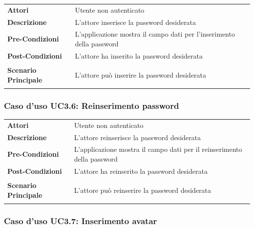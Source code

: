 \begin{longtable}{ l | p{11cm}}
	\hline
	\rowcolor{Gray}
	 \multicolumn{2}{c}{UC3.5 - Inserimento password} \\
	 \hline
	\textbf{Attori} & Utente non autenticato \\
	\textbf{Descrizione} & L'attore inserisce la password desiderata  \\
	\textbf{Pre-Condizioni} & L'applicazione mostra il campo dati per l'inserimento della password \\
	\textbf{Post-Condizioni} & L'attore ha inserito la password desiderata \\
	\textbf{Scenario Principale} & 
	\begin{enumerate*}[label=(\arabic*.),itemjoin={\newline}]
		\item L'attore può inserire la password desiderata
	\end{enumerate*}\\
\end{longtable}

\subsubsection{Caso d'uso UC3.6: Reinserimento password}
\label{UC3_6}

\begin{longtable}{ l | p{11cm}}
	\hline
	\rowcolor{Gray}
	 \multicolumn{2}{c}{UC3.6 - Reinserimento password} \\
	 \hline
	\textbf{Attori} & Utente non autenticato \\
	\textbf{Descrizione} & L'attore reinserisce la password desiderata  \\
	\textbf{Pre-Condizioni} & L'applicazione mostra il campo dati per il reinserimento della password \\
	\textbf{Post-Condizioni} & L'attore ha reinserito la password desiderata \\
	\textbf{Scenario Principale} & 
	\begin{enumerate*}[label=(\arabic*.),itemjoin={\newline}]
		\item L'attore può reinserire la password desiderata
	\end{enumerate*}\\
\end{longtable}

\subsubsection{Caso d'uso UC3.7: Inserimento avatar}
\label{UC3_7}


